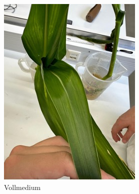 \documentclass[10pt,a4paper]{article}
\begin{document}
		\begin{figure}[H]
			\centering
			\begin{subfigure}[b]{0.4\textwidth}
				\includegraphics[width=\textwidth]{Vollmedium_.jpg}
				\caption{Vollmedium}
				\label{fig:_voll}
			\end{subfigure}
			\hfill
			\begin{subfigure}[b]{0.31\textwidth}

\end{subfigure}
\end{figure}
\end{document}
